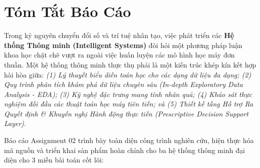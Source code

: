 \documentclass[12pt,a4paper]{report}
\begin{document}
\tableofcontents
\newpage
\listoffigures
\listoftables
\newpage
{}

\chapter*{Tóm Tắt Báo Cáo}

Trong kỷ nguyên chuyển đổi số và trí tuệ nhân tạo, việc phát triển các \textbf{Hệ thống Thông minh (Intelligent Systems)} đòi hỏi một phương pháp luận khoa học chặt chẽ vượt ra ngoài việc huấn luyện các mô hình học máy đơn thuần. Một hệ thống thông minh thực thụ phải là một kiến trúc khép kín kết hợp hài hòa giữa: \textit{(1) Lý thuyết biểu diễn toán học cho các dạng dữ liệu đa dạng; (2) Quy trình phân tích khám phá dữ liệu chuyên sâu (In-depth Exploratory Data Analysis - EDA); (3) Kỹ nghệ đặc trưng mang tính nhân quả; (4) Khảo sát thực nghiệm đối đầu các thuật toán học máy tiên tiến; và (5) Thiết kế tầng Hỗ trợ Ra Quyết định \& Khuyến nghị Hành động thực tiễn (Prescriptive Decision Support Layer)}.

Báo cáo Assignment 02 trình bày toàn diện công trình nghiên cứu, hiện thực hóa mã nguồn và triển khai sản phẩm hoàn chỉnh cho ba hệ thống thông minh đại diện cho 3 miền bài toán cốt lõi:
\end{document}
